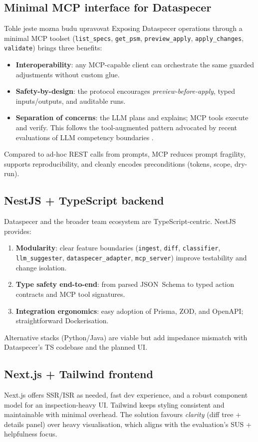 \subsection*{Minimal MCP interface for Dataspecer}
Tohle jeste mozna budu upravovat
Exposing Dataspecer operations through a minimal MCP toolset (\texttt{list\_specs}, \texttt{get\_psm}, \texttt{preview\_apply}, \texttt{apply\_changes}, \texttt{validate}) brings three benefits:
\begin{itemize}
  \item \textbf{Interoperability}: any MCP-capable client can orchestrate the same guarded adjustments without custom glue.
  \item \textbf{Safety-by-design}: the protocol encourages \emph{preview-before-apply}, typed inputs/outputs, and auditable runs.
  \item \textbf{Separation of concerns}: the LLM plans and explains; MCP tools execute and verify. This follows the tool-augmented pattern advocated by recent evaluations of LLM competency boundaries \cite{zhang2025ontourl}.
\end{itemize}
Compared to ad-hoc REST calls from prompts, MCP reduces prompt fragility, supports reproducibility, and cleanly encodes preconditions (tokens, scope, dry-run).

\subsection*{NestJS + TypeScript backend}
Dataspecer and the broader team ecosystem are TypeScript-centric. NestJS provides:
\begin{enumerate}
  \item \textbf{Modularity}: clear feature boundaries (\texttt{ingest}, \texttt{diff}, \texttt{classifier}, \texttt{llm\_suggester}, \texttt{dataspecer\_adapter}, \texttt{mcp\_server}) improve testability and change isolation.
  \item \textbf{Type safety end-to-end}: from parsed JSON~Schema to typed action contracts and MCP tool signatures.
  \item \textbf{Integration ergonomics}: easy adoption of Prisma, ZOD, and OpenAPI; straightforward Dockerisation.
\end{enumerate}
Alternative stacks (Python/Java) are viable but add impedance mismatch with Dataspecer’s TS codebase and the planned UI.

\subsection*{Next.js + Tailwind frontend}
Next.js offers SSR/ISR as needed, fast dev experience, and a robust component model for an inspection-heavy UI. Tailwind keeps styling consistent and maintainable with minimal overhead. The solution favours \emph{clarity} (diff tree + details panel) over heavy visualisation, which aligns with the evaluation’s SUS + helpfulness focus.

